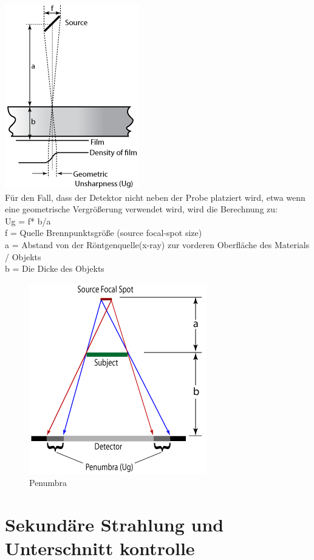   \includegraphics[scale=0.9]{img/GeometricUnsharpness2.png}\\
  

Für den Fall, dass der Detektor nicht neben der Probe platziert wird, etwa wenn eine geometrische Vergrößerung verwendet wird, wird die Berechnung zu:\\

Ug = f* b/a\\
f = Quelle Brennpunktsgröße (source focal-spot size) \\
a = Abstand von der Röntgenquelle(x-ray) zur vorderen Oberfläche des Materials / Objekts\\
b = Die Dicke des Objekts\\
\begin{figure}[htb]
  \centering 
 \includegraphics[scale=0.9]{img/Penumbra.png}
 \caption{Penumbra}
  \label{fig:Penumbra}
\end{figure}

\label{sec:RT Technik}
\section{Sekundäre Strahlung und Unterschnitt kontrolle}
\label{sec:Strahlung und Unterschnittkontrolle}
